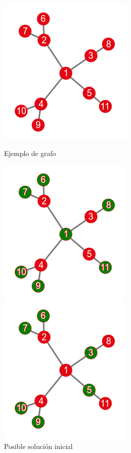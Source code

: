  
\begin{figure}[!htb]
\begin{center}
  \includegraphics[scale=0.8]{imagenes/estrellita.png}
\end{center}
  \caption{Ejemplo de grafo}\label{fig:estrellita}
\endminipage\hfill
{}
\begin{center}
  \includegraphics[scale=0.8]{imagenes/estrellitasolinicial.png}
\end{center}
  \caption{Posible solución inicial}\label{fig:solinicial}
\endminipage
\vspace*{0.3cm}
%
\begin{center}
  \includegraphics[scale=0.8]{imagenes/estrellitavec1.png}

\end{center}
\end{figure}
